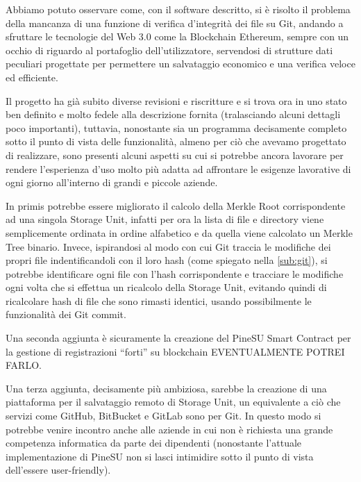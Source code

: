 Abbiamo potuto osservare come, con il software descritto, si è risolto il problema
della mancanza di una funzione di verifica d’integrità dei file su Git,
andando a sfruttare le tecnologie del Web 3.0 come la Blockchain Ethereum,
sempre con un occhio di riguardo al portafoglio dell’utilizzatore,
servendosi di strutture dati peculiari progettate per permettere un salvataggio economico
e una verifica veloce ed efficiente.

Il progetto ha già subito diverse revisioni e riscritture e si trova ora in uno
stato ben definito e molto fedele alla descrizione fornita
(tralasciando alcuni dettagli poco importanti), tuttavia, nonostante sia un programma
decisamente completo sotto il punto di vista delle funzionalità,
almeno per ciò che avevamo progettato di realizzare, sono presenti alcuni aspetti
su cui si potrebbe ancora lavorare per rendere l’esperienza d’uso molto più adatta
ad affrontare le esigenze lavorative di ogni giorno all’interno di grandi e piccole aziende.

In primis potrebbe essere migliorato il calcolo della Merkle Root corrispondente ad
una singola Storage Unit, infatti per ora la lista di file e directory viene semplicemente
ordinata in ordine alfabetico e da quella viene calcolato un Merkle Tree binario.
Invece, ispirandosi al modo con cui Git traccia le modifiche dei propri file
indentificandoli con il loro hash (come spiegato nella \autoref{sub:git}),
si potrebbe identificare ogni file con l’hash corrispondente e tracciare le modifiche
ogni volta che si effettua un ricalcolo della Storage Unit, evitando quindi di ricalcolare
hash di file che sono rimasti identici, usando possibilmente le funzionalità dei Git commit.

Una seconda aggiunta è sicuramente la creazione del PineSU Smart Contract per la gestione
di registrazioni “forti” su blockchain EVENTUALMENTE POTREI FARLO.

Una terza aggiunta, decisamente più ambiziosa, sarebbe la creazione di una piattaforma
per il salvataggio remoto di Storage Unit, un equivalente a ciò che servizi come GitHub,
BitBucket e GitLab sono per Git.
In questo modo si potrebbe venire incontro anche alle aziende in cui non è
richiesta una grande competenza informatica da parte dei dipendenti
(nonostante l’attuale implementazione di PineSU non si lasci intimidire sotto
il punto di vista dell’essere user-friendly).